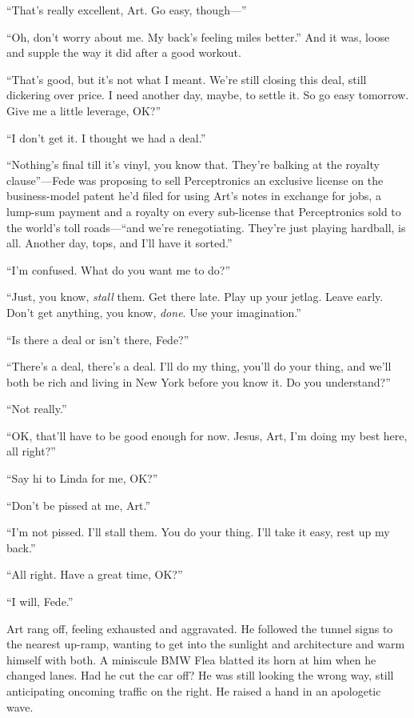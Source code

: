“That’s really excellent, Art. Go easy, though—”

“Oh, don’t worry about me. My back’s feeling miles better.” And it
was, loose and supple the way it did after a good workout.

“That’s good, but it’s not what I meant. We’re still closing this
deal, still dickering over price. I need another day, maybe, to
settle it. So go easy tomorrow. Give me a little leverage, OK?”

“I don’t get it. I thought we had a deal.”

“Nothing’s final till it’s vinyl, you know that. They’re balking at
the royalty clause”—Fede was proposing to sell Perceptronics an
exclusive license on the business-model patent he’d filed for using
Art’s notes in exchange for jobs, a lump-sum payment and a royalty
on every sub-license that Perceptronics sold to the world’s toll
roads—“and we’re renegotiating. They’re just playing hardball, is
all. Another day, tops, and I’ll have it sorted.”

“I’m confused. What do you want me to do?”

“Just, you know, \emph{stall} them. Get there late. Play up your
jetlag. Leave early. Don’t get anything, you know, \emph{done}. Use
your imagination.”

“Is there a deal or isn’t there, Fede?”

“There’s a deal, there’s a deal. I’ll do my thing, you’ll do your
thing, and we’ll both be rich and living in New York before you
know it. Do you understand?”

“Not really.”

“OK, that’ll have to be good enough for now. Jesus, Art, I’m doing
my best here, all right?”

“Say hi to Linda for me, OK?”

“Don’t be pissed at me, Art.”

“I’m not pissed. I’ll stall them. You do your thing. I’ll take it
easy, rest up my back.”

“All right. Have a great time, OK?”

“I will, Fede.”

Art rang off, feeling exhausted and aggravated. He followed the
tunnel signs to the nearest up-ramp, wanting to get into the
sunlight and architecture and warm himself with both. A miniscule
BMW Flea blatted its horn at him when he changed lanes. Had he cut
the car off? He was still looking the wrong way, still anticipating
oncoming traffic on the right. He raised a hand in an apologetic
wave.

